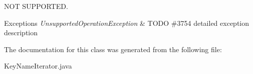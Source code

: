 N\+OT S\+U\+P\+P\+O\+R\+T\+ED. 


\begin{DoxyExceptions}{Exceptions}
{\em Unsupported\+Operation\+Exception} & T\+O\+DO \#3754 detailed exception description \\
\hline
\end{DoxyExceptions}


The documentation for this class was generated from the following file\+:\begin{DoxyCompactItemize}
\item 
Key\+Name\+Iterator.\+java\end{DoxyCompactItemize}
